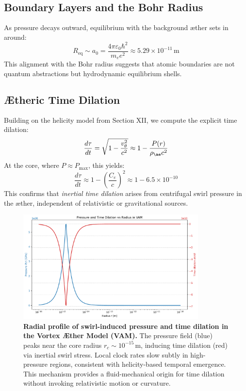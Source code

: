 \subsection{Boundary Layers and the Bohr Radius}

As pressure decays outward, equilibrium with the background æther sets in around:
\begin{equation}
    R_{\text{eq}} \sim a_0 = \frac{4\pi \varepsilon_0 \hbar^2}{m_e e^2} \approx 5.29 \times 10^{-11} \, \text{m}
\end{equation}
This alignment with the Bohr radius suggests that atomic boundaries are not quantum abstractions but hydrodynamic equilibrium shells.

\subsection{Ætheric Time Dilation}

Building on the helicity model from Section XII, we compute the explicit time dilation:
\begin{equation}
    \frac{d\tau}{dt} = \sqrt{1 - \frac{v_\theta^2}{c^2}} \approx 1 - \frac{P(r)}{\rho_{\ae} c^2}
\end{equation}
At the core, where \( P \approx P_{\text{max}} \), this yields:
\begin{equation}
    \frac{d\tau}{dt} \approx 1 - \left(\frac{C_e}{c}\right)^2 \approx 1 - 6.5 \times 10^{-10}
\end{equation}
This confirms that \emph{inertial time dilation} arises from centrifugal swirl pressure in the æther, independent of relativistic or gravitational sources.

\begin{figure}[H]
    \centering
    \includegraphics[width=0.85\textwidth]{TimeDilationCore}
    \caption{%
        \textbf{Radial profile of swirl-induced pressure and time dilation in the Vortex Æther Model (VAM).}
        The pressure field (blue) peaks near the core radius \( r_c \sim 10^{-15} \,\mathrm{m} \), inducing time dilation (red) via inertial swirl stress. Local clock rates slow subtly in high-pressure regions, consistent with helicity-based temporal emergence. This mechanism provides a fluid-mechanical origin for time dilation without invoking relativistic motion or curvature.
    }
    \label{fig:time_dilation_profile}
\end{figure}


